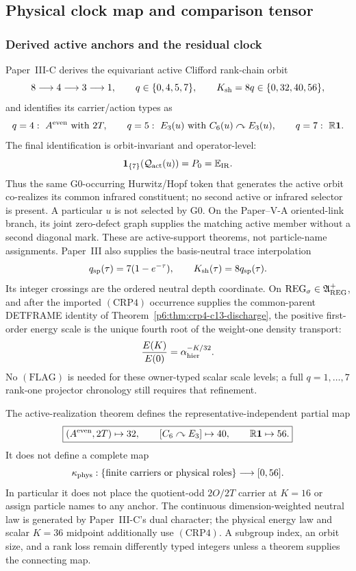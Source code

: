 \documentclass[12pt,a4paper]{article}
\begin{document}
\subsection{Physical clock map and comparison tensor}
\label{p6:sec:clock-comparison}

\subsubsection{Derived active anchors and the residual clock}

Paper~III-C derives the equivariant active Clifford rank-chain orbit
\[
8\longrightarrow4\longrightarrow3\longrightarrow1,
\qquad q\in\{0,4,5,7\},
\qquad K_{\rm sh}=8q\in\{0,32,40,56\},
\]
and identifies its carrier/action types as
\[
q=4:\ A^{\rm even}\text{ with }2T,\qquad
q=5:\ E_3(u)\text{ with }C_6(u)\curvearrowright E_3(u),\qquad
q=7:\ \mathbb R\mathbf1.
\]
The final identification is orbit-invariant and operator-level:
\[
 \mathbf1_{\{7\}}(\mathcal Q_{\rm act}(u))
 =P_0=\mathbb E_{\rm IR}.
\]
Thus the same G0-occurring Hurwitz/Hopf token that generates the active orbit
co-realizes its common infrared constituent; no second active or infrared
selector is present.  A particular \(u\) is not selected by G0.  On the
Paper--V-A oriented-link branch, its joint zero-defect graph supplies the
matching active member without a second diagonal mark.
These are active-support theorems, not particle-name assignments.  Paper~III
also supplies the basis-neutral trace interpolation
\[
q_{\rm sp}(\tau)=7(1-e^{-\tau}),
\qquad
K_{\rm sh}(\tau)=8q_{\rm sp}(\tau).
\]
Its integer crossings are the ordered neutral depth coordinate.  On
\(\mathrm{REG}_{\sigma}\in\mathfrak A_{\rm REG}^{+}\), and after the
imported \((\mathrm{CRP4})\) occurrence supplies the common-parent DETFRAME
identity of Theorem~\ref{p6:thm:crp4-c13-discharge}, the positive first-order
energy scale is the unique fourth root of the weight-one density transport:
\[
 \frac{E(K)}{E(0)}
 =\alpha_{\rm hier}^{-K/32}.
\]
No \((\mathrm{FLAG})\) is needed for these owner-typed scalar scale levels; a full
\(q=1,\ldots,7\) rank-one projector chronology still requires that
refinement.

\begin{theorem}
\label{p6:thm:clock-non-export}
The active-realization theorem defines the representative-independent partial
map
\begin{equation}
\label{p6:eq:derived-active-clock-map}
 \boxed{(A^{\rm even},2T)\mapsto32,\qquad
        [C_6\curvearrowright E_3]\mapsto40,
        \qquad\mathbb R\mathbf1\mapsto56.}
\end{equation}
It does not define a complete map
\[
\kappa_{\rm phys}:
\{\text{finite carriers or physical roles}\}\longrightarrow[0,56].
\]
In particular it does not place the quotient-odd \(2O/2T\) carrier at
\(K=16\) or assign particle names to any anchor.  The continuous
dimension-weighted neutral law is generated by Paper~III-C's dual character;
the physical energy law and scalar \(K=36\) midpoint additionally use
\((\mathrm{CRP4})\).  A subgroup index, an orbit size,
and a rank loss remain differently typed integers unless a theorem supplies
the connecting map.
\end{theorem}
\end{document}
